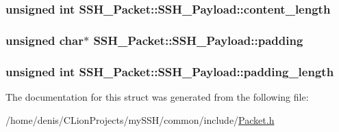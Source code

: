 \subsubsection[{\texorpdfstring{content\+\_\+length}{content_length}}]{\setlength{\rightskip}{0pt plus 5cm}unsigned int S\+S\+H\+\_\+\+Packet\+::\+S\+S\+H\+\_\+\+Payload\+::content\+\_\+length}\hypertarget{structSSH__Packet_1_1SSH__Payload_ac9ee8ecb0b1c010959ffdd83ad36f5d4}{}\label{structSSH__Packet_1_1SSH__Payload_ac9ee8ecb0b1c010959ffdd83ad36f5d4}
\subsubsection[{\texorpdfstring{padding}{padding}}]{\setlength{\rightskip}{0pt plus 5cm}unsigned char$\ast$ S\+S\+H\+\_\+\+Packet\+::\+S\+S\+H\+\_\+\+Payload\+::padding}\hypertarget{structSSH__Packet_1_1SSH__Payload_a15717400f2e8f8c8c10e955f86b391eb}{}\label{structSSH__Packet_1_1SSH__Payload_a15717400f2e8f8c8c10e955f86b391eb}
\subsubsection[{\texorpdfstring{padding\+\_\+length}{padding_length}}]{\setlength{\rightskip}{0pt plus 5cm}unsigned int S\+S\+H\+\_\+\+Packet\+::\+S\+S\+H\+\_\+\+Payload\+::padding\+\_\+length}\hypertarget{structSSH__Packet_1_1SSH__Payload_a51efea1b4439c6e97e13d583406b3b88}{}\label{structSSH__Packet_1_1SSH__Payload_a51efea1b4439c6e97e13d583406b3b88}


The documentation for this struct was generated from the following file\+:\begin{DoxyCompactItemize}
\item 
/home/denis/\+C\+Lion\+Projects/my\+S\+S\+H/common/include/\hyperlink{Packet_8h}{Packet.\+h}\end{DoxyCompactItemize}
